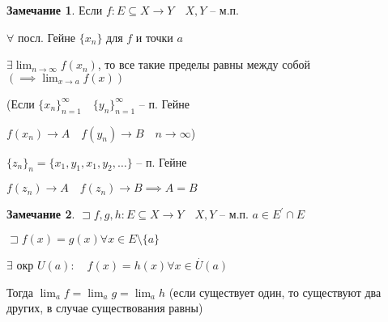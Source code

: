 \documentclass{book}
\newcommand{\p}[1]{#1^{\prime}}
\theoremstyle{definition}
\newtheorem*{note}{Замечание}
\begin{document}
    \begin{note}
        Если $f:E\subseteq X\to Y\quad X, Y$ -- м.п. 

        $\forall $ посл. Гейне $\{x_{n} \}$ для $f$ и точки  $a$

        $\exists \lim_{n \to \infty} f(x_{n} )$, то все такие пределы равны между собой $\left( \implies \lim_{x \to a} f(x) \right) $ 

        (Если $\{x_{n} \}_{n=1}^{\infty }\quad \{y_{n} \}_{n=1}^{\infty }$ -- п. Гейне

        $f(x_{n} )\to A\quad f(y_{n} )\to B\quad n\to \infty $)

        $\{z_n\}_n = \{x_1, y_1, x_1, y_2, \ldots\}$ -- п. Гейне

        $f(z_n)\to A\quad f(z_n)\to B \implies A = B$
    \end{note}

    \begin{note}
        $\sqsupset f, g, h:E\subseteq X \to Y\quad X, Y$ -- м.п. $a\in \p E\cap E$

        $\sqsupset f(x) = g(x) \forall x\in E\setminus \{a\}$

        $\exists $ окр $U(a):\quad f(x) = h(x)\forall x\in \overset{\cdot}U(a)$

        Тогда $\lim_{a} f = \lim_ag = \lim_ah$ (если существует один, то существуют два других, в случае существования равны)
    \end{note}
\end{document}
